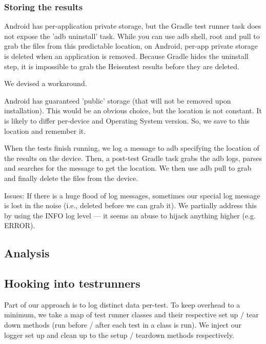\subsubsection{Storing the results}

Android has per-application private storage, but the Gradle test runner task does not expose the 'adb uninstall' task. While you can use adb shell, root and pull to grab the files from this predictable location, on Android, per-app private storage is deleted when an application is removed. Because Gradle hides the uninstall step, it is impossible to grab the Heisentest results before they are deleted.

We devised a workaround.

Android has guaranteed 'public' storage (that will not be removed upon installation). This would be an obvious choice, but the location is not constant. It is likely to differ per-device and Operating System version. So, we save to this location and remember it.

When the tests finish running, we log a message to adb specifying the location of the results on the device. Then, a post-test Gradle task grabs the adb logs, parses and searches for the message to get the location. We then use adb pull to grab and finally delete the files from the device.

Issues:
If there is a huge flood of log messages, sometimes our special log message is lost in the noise (i.e., deleted before we can grab it). We partially address this by using the INFO log level --- it seems an abuse to hijack anything higher (e.g. ERROR).

\subsection{Analysis}


\subsection{Hooking into testrunners}

Part of our approach is to log distinct data per-test. To keep overhead to a minimum, we take a map of test runner classes and their respective set up / tear down methods (run before / after each test in a class is run). We inject our logger set up and clean up to the setup / teardown methods respectively.

